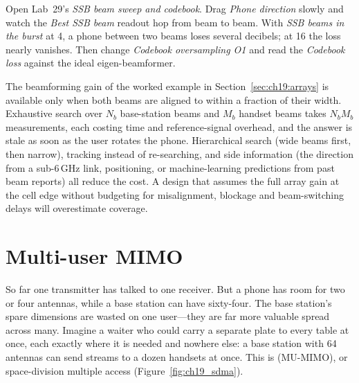 \begin{tryit}
Open Lab~29's \emph{SSB beam sweep and codebook}. Drag \emph{Phone direction} slowly and watch the
\emph{Best SSB beam} readout hop from beam to beam. With \emph{SSB beams in the burst} at 4, a phone
between two beams loses several decibels; at 16 the loss nearly vanishes. Then change
\emph{Codebook oversampling O1} and read the \emph{Codebook loss} against the ideal
eigen-beamformer.
\end{tryit}

\begin{pitfall}
The beamforming gain of the worked example in Section~\ref{sec:ch19:arrays} is available only when
both beams are aligned to within a fraction of their width. Exhaustive search over $N_b$ base-station
beams and $M_b$ handset beams takes $N_bM_b$ measurements, each costing time and reference-signal
overhead, and the answer is stale as soon as the user rotates the phone. Hierarchical search
(wide beams first, then narrow), tracking instead of re-searching, and side information (the
direction from a sub-6\,GHz link, positioning, or machine-learning predictions from past beam
reports) all reduce the cost. A design that assumes the full array gain at the cell edge without
budgeting for misalignment, blockage and beam-switching delays will overestimate coverage.
\end{pitfall}

\section{Multi-user MIMO}
\label{sec:ch19:mumimo}

So far one transmitter has talked to one receiver. But a phone has room for two or four antennas,
while a base station can have sixty-four. The base station's spare dimensions are wasted on one
user---they are far more valuable spread across many. Imagine a waiter who could carry a separate
plate to every table at once, each exactly where it is needed and nowhere else: a base station
with 64 antennas can send streams to a dozen handsets at once. This is 
(MU-MIMO), or space-division multiple access (Figure~\ref{fig:ch19_sdma}).

